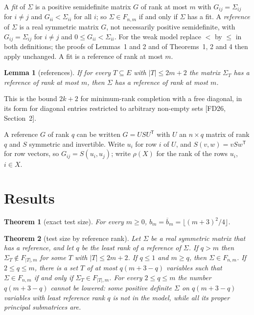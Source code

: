 \documentclass[11pt,letterpaper,reqno]{amsart}
\theoremstyle{spaced}
\newtheorem{theorem}{Theorem}
\newtheorem{lemma}{Lemma}
\begin{document}
A \emph{fit} of \(\Sigma\) is a positive semidefinite matrix \(G\) of rank at most \(m\) with \(G_{ij} = \Sigma_{ij}\) for \(i \ne j\) and \(G_{ii} < \Sigma_{ii}\) for all \(i\); so \(\Sigma \in F_{n,m}\) if and only if \(\Sigma\) has a fit. A \emph{reference} of \(\Sigma\) is a real symmetric matrix \(G\), not necessarily positive semidefinite, with \(G_{ij} = \Sigma_{ij}\) for \(i \ne j\) and \(0 \le G_{ii} < \Sigma_{ii}\). For the weak model replace \(<\) by \(\le\) in both definitions; the proofs of Lemmas~1 and 2 and of Theorems~1, 2 and 4 then apply unchanged. A fit is a reference of rank at most \(m\).

\begin{lemma}[references]
If for every \(T \subseteq E\) with \(\lvert T\rvert \le 2m+2\) the matrix \(\Sigma_T\) has a reference of rank at most \(m\), then \(\Sigma\) has a reference of rank at most \(m\).
\end{lemma}

This is the bound \(2k+2\) for minimum-rank completion with a free diagonal, in its form for diagonal entries restricted to arbitrary non-empty sets {[}FD26, Section~2{]}.

A reference \(G\) of rank \(q\) can be written \(G = U S U^{\mathsf T}\) with \(U\) an \(n \times q\) matrix of rank \(q\) and \(S\) symmetric and invertible. Write \(u_i\) for row \(i\) of \(U\), and \(S(v, w) = v S w^{\mathsf T}\) for row vectors, so \(G_{ij} = S(u_i, u_j)\); write \(\rho(X)\) for the rank of the rows \(u_i\), \(i \in X\).

\hypertarget{results}{%
\section{Results}\label{results}}

\begin{theorem}[exact test size]
For every \(m \ge 0\), \(b_m = \overline{b}_m = \lfloor (m+3)^2/4 \rfloor\).
\end{theorem}

\begin{theorem}[test size by reference rank]
Let \(\Sigma\) be a real symmetric matrix that has a reference, and let \(q\) be the least rank of a reference of \(\Sigma\). If \(q > m\) then \(\Sigma_T \notin F_{\lvert T\rvert,m}\) for some \(T\) with \(\lvert T\rvert \le 2m+2\). If \(q \le 1\) and \(m \ge q\), then \(\Sigma \in F_{n,m}\). If \(2 \le q \le m\), there is a set \(T\) of at most \(q(m+3-q)\) variables such that \(\Sigma \in F_{n,m}\) if and only if \(\Sigma_T \in F_{\lvert T\rvert,m}\). For every \(2 \le q \le m\) the number \(q(m+3-q)\) cannot be lowered: some positive definite \(\Sigma\) on \(q(m+3-q)\) variables with least reference rank \(q\) is not in the model, while all its proper principal submatrices are.
\end{theorem}
\end{document}
